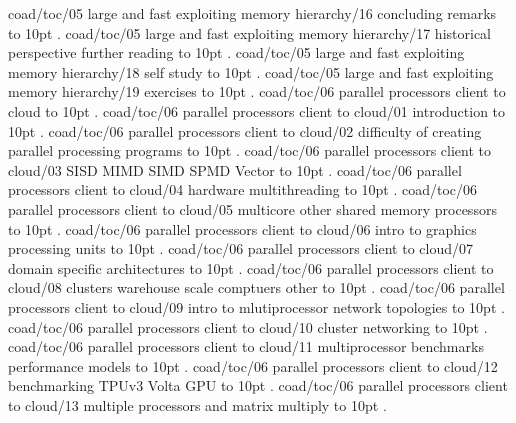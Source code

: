 \smallskip
coad/toc/05 large and fast exploiting memory hierarchy/16 concluding remarks \leaders\hbox to 10pt {\hss.\hss}  \hfill {}
\smallskip
coad/toc/05 large and fast exploiting memory hierarchy/17 historical perspective further reading \leaders\hbox to 10pt {\hss.\hss}  \hfill {}
\smallskip
coad/toc/05 large and fast exploiting memory hierarchy/18 self study \leaders\hbox to 10pt {\hss.\hss}  \hfill {}
\smallskip
coad/toc/05 large and fast exploiting memory hierarchy/19 exercises \leaders\hbox to 10pt {\hss.\hss}  \hfill {}
\smallskip
coad/toc/06 parallel processors client to cloud \leaders\hbox to 10pt {\hss.\hss}  \hfill {}
\smallskip
coad/toc/06 parallel processors client to cloud/01 introduction \leaders\hbox to 10pt {\hss.\hss}  \hfill {}
\smallskip
coad/toc/06 parallel processors client to cloud/02 difficulty of creating parallel processing programs \leaders\hbox to 10pt {\hss.\hss}  \hfill {}
\smallskip
coad/toc/06 parallel processors client to cloud/03 SISD MIMD SIMD SPMD Vector \leaders\hbox to 10pt {\hss.\hss}  \hfill {}
\smallskip
coad/toc/06 parallel processors client to cloud/04 hardware multithreading \leaders\hbox to 10pt {\hss.\hss}  \hfill {}
\smallskip
coad/toc/06 parallel processors client to cloud/05 multicore other shared memory processors \leaders\hbox to 10pt {\hss.\hss}  \hfill {}
\smallskip
coad/toc/06 parallel processors client to cloud/06 intro to graphics processing units \leaders\hbox to 10pt {\hss.\hss}  \hfill {}
\smallskip
coad/toc/06 parallel processors client to cloud/07 domain specific architectures \leaders\hbox to 10pt {\hss.\hss}  \hfill {}
\smallskip
coad/toc/06 parallel processors client to cloud/08 clusters warehouse scale comptuers other \leaders\hbox to 10pt {\hss.\hss}  \hfill {}
\smallskip
coad/toc/06 parallel processors client to cloud/09 intro to mlutiprocessor network topologies \leaders\hbox to 10pt {\hss.\hss}  \hfill {}
\smallskip
coad/toc/06 parallel processors client to cloud/10 cluster networking \leaders\hbox to 10pt {\hss.\hss}  \hfill {}
\smallskip
coad/toc/06 parallel processors client to cloud/11 multiprocessor benchmarks performance models \leaders\hbox to 10pt {\hss.\hss}  \hfill {}
\smallskip
coad/toc/06 parallel processors client to cloud/12 benchmarking TPUv3 Volta GPU \leaders\hbox to 10pt {\hss.\hss}  \hfill {}
\smallskip
coad/toc/06 parallel processors client to cloud/13 multiple processors and matrix multiply \leaders\hbox to 10pt {\hss.\hss}  \hfill {}
